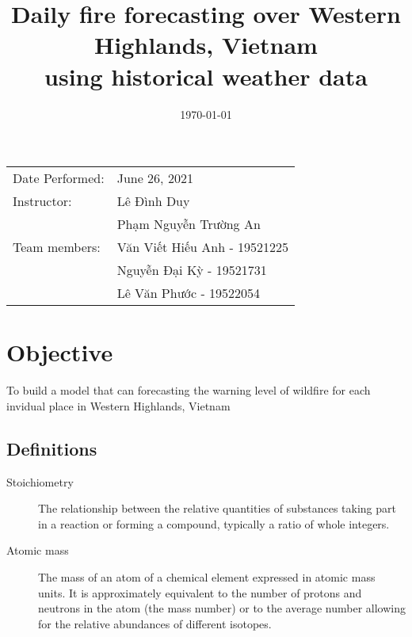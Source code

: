 \documentclass{article}
\begin{document}
\title{Daily fire forecasting over Western Highlands, Vietnam \\ using historical weather data} %
\date{\today} %
\maketitle %

\begin{center}
    \begin{tabular}{l l}
        Date Performed: & June 26, 2021                \\ %
        Instructor:     & Lê Đình Duy                  \\
                        & Phạm Nguyễn Trường An        \\
        Team members:   & Văn Viết Hiếu Anh - 19521225 \\
                        & Nguyễn Đại Kỳ - 19521731     \\
                        & Lê Văn Phước - 19522054      \\
    \end{tabular}
\end{center}




\section{Objective}

To build a model that can forecasting the warning level
of wildfire for each invidual place in Western Highlands, Vietnam

\subsection{Definitions}
\label{definitions}
\begin{description}
    \item[Stoichiometry]
          The relationship between the relative quantities of substances taking part in a reaction or forming a compound, typically a ratio of whole integers.
    \item[Atomic mass]
          The mass of an atom of a chemical element expressed in atomic mass units. It is approximately equivalent to the number of protons and neutrons in the atom (the mass number) or to the average number allowing for the relative abundances of different isotopes.
\end{description}
\end{document}
